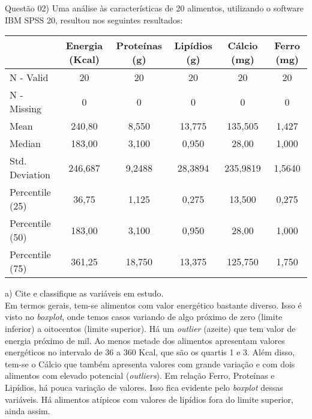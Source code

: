 
\noindent \textcolor{COLOR1}{Questão 02)}  Uma análise às características de 20 alimentos, utilizando o software IBM SPSS 20, resultou nos
seguintes resultados:
\\



\begin{longtable}{l|c|c|c|c|c}
    \hline
    \rowcolor{pagecolor!50!COLOR1}
                    & Energia (Kcal) & Proteínas (g) & Lipídios (g) & Cálcio (mg) & Ferro (mg) \\ \hline\hline
    N - Valid       & 20             & 20            & 20           & 20          & 20         \\ \hline
    N - Missing     & 0              & 0             & 0            & 0           & 0          \\ \hline
    Mean            & 240,80         & 8,550         & 13,775       & 135,505     & 1,427      \\ \hline
    Median          & 183,00         & 3,100         & 0,950        & 28,00       & 1,000      \\ \hline
    Std. Deviation  & 246,687        & 9,2488        & 28,3894      & 235,9819    & 1,5640     \\ \hline
    Percentile (25) & 36,75          & 1,125         & 0,275        & 13,500      & 0,275      \\ \hline
    Percentile (50) & 183,00         & 3,100         & 0,950        & 28,00       & 1,000      \\ \hline
    Percentile (75) & 361,25         & 18,750        & 13,375       & 125,750     & 1,750      \\ \hline
\end{longtable}


a) Cite e classifique as variáveis em estudo.
\\

Em termos gerais, tem-se alimentos com valor energético bastante diverso. Isso é visto no \textit{boxplot}, onde temos casos variando de algo próximo de zero (limite inferior) a oitocentos (limite superior). Há um \textit{outlier} (azeite) que tem valor de energia próximo de mil. Ao menos metade dos alimentos apresentam valores energéticos no intervalo de 36 a 360 Kcal, que são os quartis 1 e 3. Além disso, tem-se o Cálcio que também apresenta valores com grande variação e com dois alimentos com elevado potencial (\textit{outliers}). Em relação Ferro, Proteínas e Lipídios, há pouca variação de valores. Isso fica evidente pelo \textit{boxplot} dessas variáveis. Há alimentos atípicos com valores de lipídios fora do limite superior, ainda assim.
\\

